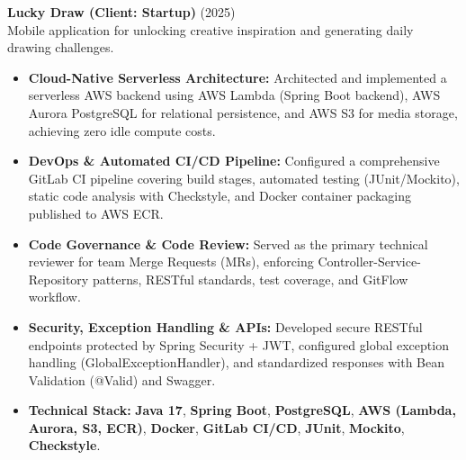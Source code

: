 \documentclass[10pt, letterpaper]{article}
\begin{document}
\textbf{Lucky Draw (Client: Startup)} \hfill (2025) \\
Mobile application for unlocking creative inspiration and generating daily drawing challenges.
\begin{itemize}
    \item \textbf{Cloud-Native Serverless Architecture:} Architected and implemented a serverless AWS backend using AWS Lambda (Spring Boot backend), AWS Aurora PostgreSQL for relational persistence, and AWS S3 for media storage, achieving zero idle compute costs.

    \item \textbf{DevOps \& Automated CI/CD Pipeline:} Configured a comprehensive GitLab CI pipeline covering build stages, automated testing (JUnit/Mockito), static code analysis with Checkstyle, and Docker container packaging published to AWS ECR.

    \item \textbf{Code Governance \& Code Review:} Served as the primary technical reviewer for team Merge Requests (MRs), enforcing Controller-Service-Repository patterns, RESTful standards, test coverage, and GitFlow workflow.

    \item \textbf{Security, Exception Handling \& APIs:} Developed secure RESTful endpoints protected by Spring Security + JWT, configured global exception handling (GlobalExceptionHandler), and standardized responses with Bean Validation (@Valid) and Swagger.

    \item \textbf{Technical Stack:} \textbf{Java 17}, \textbf{Spring Boot}, \textbf{PostgreSQL}, \textbf{AWS (Lambda, Aurora, S3, ECR)}, \textbf{Docker}, \textbf{GitLab CI/CD}, \textbf{JUnit}, \textbf{Mockito}, \textbf{Checkstyle}.
\end{itemize}
\end{document}
